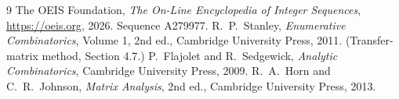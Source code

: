 \documentclass[11pt,a4paper]{article}
\theoremstyle{plain}
\theoremstyle{definition}
\begin{document}
\begin{thebibliography}{9}
 The OEIS Foundation, \emph{The On-Line Encyclopedia of Integer
Sequences}, \url{https://oeis.org}, 2026. Sequence A279977.
 R.~P.~Stanley, \emph{Enumerative Combinatorics}, Volume 1, 2nd ed.,
Cambridge University Press, 2011. (Transfer-matrix method, Section 4.7.)
 P.~Flajolet and R.~Sedgewick, \emph{Analytic Combinatorics}, Cambridge
University Press, 2009.
 R.~A.~Horn and C.~R.~Johnson, \emph{Matrix Analysis}, 2nd ed., Cambridge
University Press, 2013.
\end{thebibliography}
\end{document}
